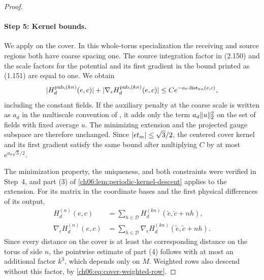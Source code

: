 \begin{proof}
\paragraph{Step 5: Kernel bounds.}
We apply \cite[Proposition~2.7, (2.149), and Corollary~2.8, (2.150) and the bound printed as (1.151), p.~249]{Balaban1984II} on the cover. In this whole-torus specialization the receiving and source regions both have coarse spacing one. The source integration factor in (2.150) and the scale factors for the potential and its first gradient in the bound printed as (1.151) are equal to one. We obtain
\[
 \lvert H_d^{\mathrm{pub},(kn)}(e,c)\rvert+\lvert \nabla_\epsilon H_d^{\mathrm{pub},(kn)}(e,c)\rvert\le Ce^{-a_0\operatorname{dist}_{kn}(e,c)},
\]
including the constant fields. If the auxiliary penalty at the coarse scale is written as $a_d$ in the multiscale convention of \cite{Balaban1984I}, it adds only the term $a_d\lVert u\rVert_2^2$ on the set of fields with fixed average $u$. The minimizing extension and the projected gauge subspace are therefore unchanged. Since $\lvert \epsilon t_m\rvert\le\sqrt3/2$, the centered cover kernel and its first gradient satisfy the same bound after multiplying $C$ by at most $e^{a_0\sqrt3/2}$.

The minimization property, the uniqueness, and both constraints were verified in Step~4, and part (3) of \cref{ch06:lem:periodic-kernel-descent} applies to the extension. For its matrix in the coordinate bases and the first physical differences of its output,
\begin{equation}\label{ch06:eq:extension-cover-kernel}
 \begin{aligned}
 H_d^{(n)}(e,c)&=\sum_{h\in\mathcal D}H_d^{(kn)}(\widetilde e,\widetilde c+nh),\\
 \nabla_\epsilon H_d^{(n)}(e,c)&=\sum_{h\in\mathcal D}\nabla_\epsilon H_d^{(kn)}(\widetilde e,\widetilde c+nh).
 \end{aligned}
\end{equation}
Since every distance on the cover is at least the corresponding distance on the torus of side $n$, the pointwise estimate of part (4) follows with at most an additional factor $k^3$, which depends only on $M$. Weighted rows also descend without this factor, by \eqref{ch06:eq:cover-weighted-row}.


\end{proof}
